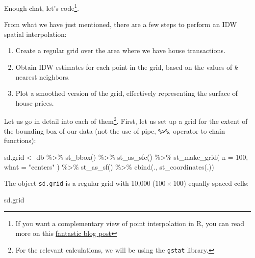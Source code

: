 \documentclass[
  letterpaper,
  DIV=11,
  numbers=noendperiod,
  oneside]{scrreprt}
\newenvironment{Shaded}{\begin{snugshade}}{\end{snugshade}}
\newcommand{\AttributeTok}[1]{\textcolor[rgb]{0.40,0.45,0.13}{#1}}
\newcommand{\DecValTok}[1]{\textcolor[rgb]{0.68,0.00,0.00}{#1}}
\newcommand{\FunctionTok}[1]{\textcolor[rgb]{0.28,0.35,0.67}{#1}}
\newcommand{\NormalTok}[1]{\textcolor[rgb]{0.00,0.23,0.31}{#1}}
\newcommand{\OtherTok}[1]{\textcolor[rgb]{0.00,0.23,0.31}{#1}}
\newcommand{\SpecialCharTok}[1]{\textcolor[rgb]{0.37,0.37,0.37}{#1}}
\newcommand{\StringTok}[1]{\textcolor[rgb]{0.13,0.47,0.30}{#1}}
\providecommand{\tightlist}{%
  \setlength{\itemsep}{0pt}\setlength{\parskip}{0pt}}\usepackage{longtable,booktabs,array}
\begin{document}
Enough chat, let's code\footnote{If you want a complementary view of
  point interpolation in R, you can read more on this
  \href{https://swilke-geoscience.net/post/2020-09-10-kriging_with_r/kriging/}{fantastic
  blog post}}.

From what we have just mentioned, there are a few steps to perform an
IDW spatial interpolation:

\begin{enumerate}
\def\labelenumi{\arabic{enumi}.}
\tightlist
\item
  Create a regular grid over the area where we have house transactions.
\item
  Obtain IDW estimates for each point in the grid, based on the values
  of \(k\) nearest neighbors.
\item
  Plot a smoothed version of the grid, effectively representing the
  surface of house prices.
\end{enumerate}

Let us go in detail into each of them\footnote{For the relevant
  calculations, we will be using the \texttt{gstat} library.}. First,
let us set up a grid for the extent of the bounding box of our data (not
the use of pipe, \texttt{\%\textgreater{}\%}, operator to chain
functions):

\begin{Shaded}
\begin{Highlighting}[]
\NormalTok{sd.grid }\OtherTok{\textless{}{-}}\NormalTok{ db }\SpecialCharTok{\%\textgreater{}\%}
  \FunctionTok{st\_bbox}\NormalTok{() }\SpecialCharTok{\%\textgreater{}\%}
  \FunctionTok{st\_as\_sfc}\NormalTok{() }\SpecialCharTok{\%\textgreater{}\%}
  \FunctionTok{st\_make\_grid}\NormalTok{(}
    \AttributeTok{n =} \DecValTok{100}\NormalTok{,}
    \AttributeTok{what =} \StringTok{"centers"}
\NormalTok{  ) }\SpecialCharTok{\%\textgreater{}\%}
  \FunctionTok{st\_as\_sf}\NormalTok{() }\SpecialCharTok{\%\textgreater{}\%}
  \FunctionTok{cbind}\NormalTok{(., }\FunctionTok{st\_coordinates}\NormalTok{(.))}
\end{Highlighting}
\end{Shaded}

The object \texttt{sd.grid} is a regular grid with 10,000
(\(100 \times 100\)) equally spaced cells:

\begin{Shaded}
\begin{Highlighting}[]
\NormalTok{sd.grid}
\end{Highlighting}
\end{Shaded}
\end{document}
